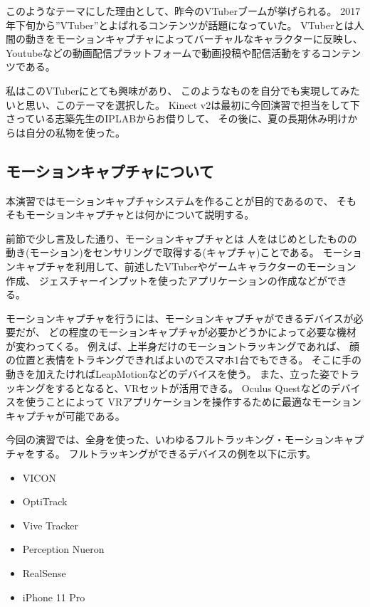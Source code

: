 \documentclass[a4j]{jsarticle}
\begin{document}
このようなテーマにした理由として、昨今のVTuberブームが挙げられる。
2017年下旬から”VTuber”とよばれるコンテンツが話題になっていた。
VTuberとは人間の動きをモーションキャプチャによってバーチャルなキャラクターに反映し、
Youtubeなどの動画配信プラットフォームで動画投稿や配信活動をするコンテンツである。

私はこのVTuberにとても興味があり、
このようなものを自分でも実現してみたいと思い、このテーマを選択した。
Kinect v2は最初に今回演習で担当をして下さっている志築先生のIPLABからお借りして、
その後に、夏の長期休み明けからは自分の私物を使った。

\subsection{モーションキャプチャについて}

本演習ではモーションキャプチャシステムを作ることが目的であるので、
そもそもモーションキャプチャとは何かについて説明する。

前節で少し言及した通り、モーションキャプチャとは
人をはじめとしたものの動き(モーション)をセンサリングで取得する(キャプチャ)ことである。
モーションキャプチャを利用して、前述したVTuberやゲームキャラクターのモーション作成、
ジェスチャーインプットを使ったアプリケーションの作成などができる。

モーションキャプチャを行うには、モーションキャプチャができるデバイスが必要だが、
どの程度のモーションキャプチャが必要かどうかによって必要な機材が変わってくる。
例えば、上半身だけのモーショントラッキングであれば、
顔の位置と表情をトラキングできればよいのでスマホ1台でもできる。
そこに手の動きを加えたければLeapMotionなどのデバイスを使う。
また、立った姿でトラッキングをするとなると、VRセットが活用できる。
Oculus Questなどのデバイスを使うことによって
VRアプリケーションを操作するために最適なモーションキャプチャが可能である。

今回の演習では、全身を使った、いわゆるフルトラッキング・モーションキャプチャをする。
フルトラッキングができるデバイスの例を以下に示す。

\begin{itemize}
  \item VICON
  \item OptiTrack
  \item Vive Tracker
  \item Perception Nueron
  \item RealSense
  \item iPhone 11 Pro
\end{itemize}
\end{document}
